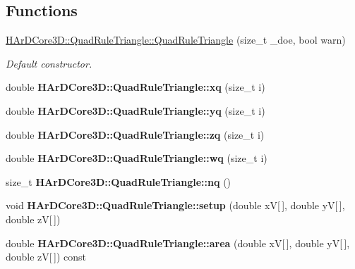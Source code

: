 \subsection*{Functions}
\begin{DoxyCompactItemize}
\item 
\hyperlink{group__Quadratures_ga0d95447bb72cfc1b19cd2ea192ff6695}{H\+Ar\+D\+Core3\+D\+::\+Quad\+Rule\+Triangle\+::\+Quad\+Rule\+Triangle} (size\+\_\+t \+\_\+doe, bool warn)
\begin{DoxyCompactList}\small\item\em Default constructor. \end{DoxyCompactList}\item 
\mbox{\label{group__Quadratures_ga98156eda410a5aa6f9787ce920358fca}} 
double {\bfseries H\+Ar\+D\+Core3\+D\+::\+Quad\+Rule\+Triangle\+::xq} (size\+\_\+t i)
\item 
\mbox{\label{group__Quadratures_ga0aa8f08c87bc5b2bc8180c149e16a4c2}} 
double {\bfseries H\+Ar\+D\+Core3\+D\+::\+Quad\+Rule\+Triangle\+::yq} (size\+\_\+t i)
\item 
\mbox{\label{group__Quadratures_ga24bec7179e0f2f637d49f594d8bd1e2a}} 
double {\bfseries H\+Ar\+D\+Core3\+D\+::\+Quad\+Rule\+Triangle\+::zq} (size\+\_\+t i)
\item 
\mbox{\label{group__Quadratures_ga47725c429eec36e849a8bbf69a924303}} 
double {\bfseries H\+Ar\+D\+Core3\+D\+::\+Quad\+Rule\+Triangle\+::wq} (size\+\_\+t i)
\item 
\mbox{\label{group__Quadratures_ga5071f69f8f99171329a13943d5fe515d}} 
size\+\_\+t {\bfseries H\+Ar\+D\+Core3\+D\+::\+Quad\+Rule\+Triangle\+::nq} ()
\item 
\mbox{\label{group__Quadratures_ga5b3fbfdc8b8c49bd090bf216cfe105ee}} 
void {\bfseries H\+Ar\+D\+Core3\+D\+::\+Quad\+Rule\+Triangle\+::setup} (double xV\mbox{[}$\,$\mbox{]}, double yV\mbox{[}$\,$\mbox{]}, double zV\mbox{[}$\,$\mbox{]})
\item 
\mbox{\label{group__Quadratures_gad87031214049b17a0a1839507f08e8cb}} 
double {\bfseries H\+Ar\+D\+Core3\+D\+::\+Quad\+Rule\+Triangle\+::area} (double xV\mbox{[}$\,$\mbox{]}, double yV\mbox{[}$\,$\mbox{]}, double zV\mbox{[}$\,$\mbox{]}) const

\end{DoxyCompactItemize}
